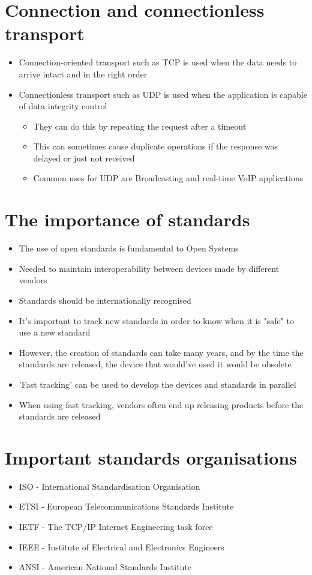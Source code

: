\section*{Connection and connectionless transport}

\begin{itemize}
  \item Connection-oriented transport such as TCP is used when the data needs to arrive intact and in the right order
  \item Connectionless transport such as UDP is used when the application is capable of data integrity control
  \begin{itemize}
    \item They can do this by repeating the request after a timeout
    \item This can sometimes cause duplicate operations if the response was delayed or just not received
    \item Common uses for UDP are Broadcasting and real-time VoIP applications
  \end{itemize}
\end{itemize}

\section*{The importance of standards}

\begin{itemize}
  \item The use of open standards is fundamental to Open Systems
  \item Needed to maintain interoperability between devices made by different vendors
  \item Standards should be internationally recognised
  \item It's important to track new standards in order to know when it is "safe" to use a new standard
  \item However, the creation of standards can take many years, and by the time the standards are released, the device that would've used it would be obsolete
  \item 'Fast tracking' can be used to develop the devices and standards in parallel
  \item When using fast tracking, vendors often end up releasing products before the standards are released
\end{itemize}

\section*{Important standards organisations}

\begin{itemize}
  \item ISO - International Standardisation Organisation
  \item ETSI - European Telecommunications Standards Institute
  \item IETF - The TCP/IP Internet Engineering task force
  \item IEEE - Institute of Electrical and Electronics Engineers
  \item ANSI - American National Standards Institute
\end{itemize}